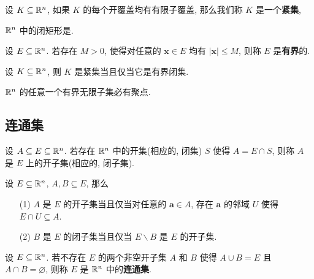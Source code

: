 \begin{definition}[紧集]\label{紧集}
	设 $K\subseteq \mathbb {R}^{n}$, 如果 $K$ 的每个开覆盖均有有限子覆盖, 那么我们称 $K$ 是一个\textbf{紧集},
\end{definition}

\begin{proposition}
	$\mathbb {R}^{n}$ 中的闭矩形是.
\end{proposition}

\begin{definition}[有界]\label{有界}
	设 $E\subseteq \mathbb {R}^{n}$. 若存在 $M>0$, 使得对任意的 $\bm x\in E$ 均有 $|\bm x|\le M$, 则称 $E$ 是\textbf{有界}的.
\end{definition}

\begin{theorem}
	设 $K\subseteq \mathbb {R}^{n}$, 则 $K$ 是紧集当且仅当它是有界闭集.
\end{theorem}

\begin{theorem}
	$\mathbb {R}^{n}$ 的任意一个有界无限子集必有聚点.
\end{theorem}

\subsection{连通集}
\begin{definition}[开(闭)子集]
	设 $A\subseteq E \subseteq \mathbb {R}^{n}$. 若存在 $\mathbb {R}^{n}$ 中的开集(相应的, 闭集) $S$ 使得 $A=E\cap S$, 则称 $A$ 是 $E$ 上的开子集(相应的, 闭子集).
\end{definition}

\begin{proposition}
	设 $E\subseteq \mathbb {R}^{n}$, $A,B \subseteq E$, 那么
	\begin{itemize}[leftmargin=1.5cm]
		\item[(1)] $A$ 是 $E$ 的开子集当且仅当对任意的 $\bm a \in A$, 存在 $\bm a$ 的邻域 $U$ 使得 $E \cap U \subseteq A$.
		\item[(2)] $B$ 是 $E$ 的闭子集当且仅当 $E \backslash B$ 是 $E$ 的开子集.
	\end{itemize}
\end{proposition}

\begin{definition}[连通集]\label{连通集}
	设 $E \subseteq \mathbb {R}^{n}$. 若不存在 $E$ 的两个非空开子集 $A$ 和 $B$ 使得 $A \cup B=E$ 且 $A\cap B=\varnothing$, 则称 $E$ 是 $\mathbb {R}^{n}$ 中的\textbf{连通集}.
\end{definition}

